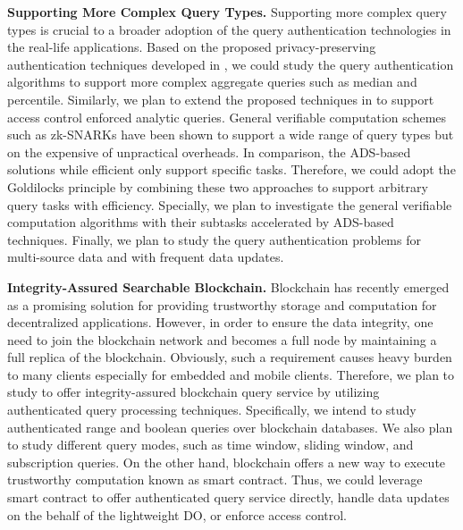 \textbf{Supporting More Complex Query Types.}
Supporting more complex query types is crucial to a broader adoption of the query authentication technologies in the real-life applications.
Based on the proposed privacy-preserving authentication techniques developed in , we could study the query authentication algorithms to support more complex aggregate queries such as median and percentile. Similarly, we plan to extend the proposed techniques in  to support access control enforced analytic queries. General verifiable computation schemes such as zk-SNARKs have been shown to support a wide range of query types but on the expensive of unpractical overheads. In comparison, the ADS-based solutions while efficient only support specific tasks. Therefore, we could adopt the Goldilocks principle by combining these two approaches to support arbitrary query tasks with efficiency. Specially, we plan to investigate the general verifiable computation algorithms with their subtasks accelerated by ADS-based techniques. Finally, we plan to study the query authentication problems for multi-source data and with frequent data updates.

\textbf{Integrity-Assured Searchable Blockchain.}
Blockchain has recently emerged as a promising solution for providing trustworthy storage and computation for decentralized applications. However, in order to ensure the data integrity, one need to join the blockchain network and becomes a full node by maintaining a full replica of the blockchain. Obviously, such a requirement causes heavy burden to many clients especially for embedded and mobile clients. Therefore, we plan to study to offer integrity-assured blockchain query service by utilizing authenticated query processing techniques. Specifically, we intend to study authenticated range and boolean queries over blockchain databases. We also plan to study different query modes, such as time window, sliding window, and subscription queries. On the other hand, blockchain offers a new way to execute trustworthy computation known as smart contract. Thus, we could leverage smart contract to offer authenticated query service directly, handle data updates on the behalf of the lightweight DO, or enforce access control.

